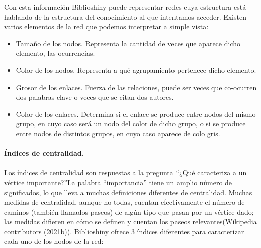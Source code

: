 \documentclass[
]{article}
\providecommand{\tightlist}{%
  \setlength{\itemsep}{0pt}\setlength{\parskip}{0pt}}
\begin{document}
Con esta información Biblioshiny puede representar redes cuya estructura
está hablando de la estructura del conocimiento al que intentamos
acceder. Existen varios elementos de la red que podemos interpretar a
simple vista:

\begin{itemize}
\tightlist
\item
  Tamaño de los nodos. Representa la cantidad de veces que aparece dicho
  elemento, las ocurrencias.
\item
  Color de los nodos. Representa a qué agrupamiento pertenece dicho
  elemento.
\item
  Grosor de los enlaces. Fuerza de las relaciones, puede ser veces que
  co-ocurren dos palabras clave o veces que se citan dos autores.
\item
  Color de los enlaces. Determina si el enlace se produce entre nodos
  del mismo grupo, en cuyo caso será un nodo del color de dicho grupo, o
  si se produce entre nodos de distintos grupos, en cuyo caso aparece de
  colo gris.
\end{itemize}

\hypertarget{uxedndices-de-centralidad.}{%
\paragraph{Índices de centralidad.}\label{uxedndices-de-centralidad.}}

Los índices de centralidad son respuestas a la pregunta ``¿Qué
caracteriza a un vértice importante?''La palabra ``importancia'' tiene
un amplio número de significados, lo que lleva a muchas definiciones
diferentes de centralidad. Muchas medidas de centralidad, aunque no
todas, cuentan efectivamente el número de caminos (también llamados
paseos) de algún tipo que pasan por un vértice dado; las medidas
difieren en cómo se definen y cuentan los paseos relevantes(Wikipedia
contributors (2021b)). Biblioshiny ofrece 3 índices diferentes para
caracterizar cada uno de los nodos de la red:
\end{document}
